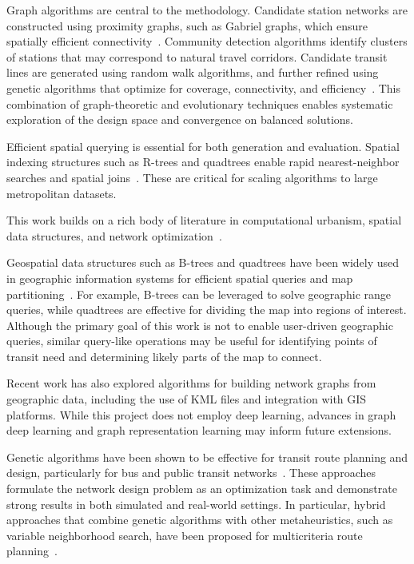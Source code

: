 \documentclass[manuscript]{acmart}
\begin{document}
Graph algorithms are central to the methodology. Candidate station networks are constructed using proximity graphs, such as Gabriel graphs, which ensure spatially efficient connectivity~\cite{bib:samet1984quadtrees, bib:libera1986btrees}. Community detection algorithms identify clusters of stations that may correspond to natural travel corridors. Candidate transit lines are generated using random walk algorithms, and further refined using genetic algorithms that optimize for coverage, connectivity, and efficiency~\cite{bib:chien2001genetic, bib:dib2017ga}. This combination of graph-theoretic and evolutionary techniques enables systematic exploration of the design space and convergence on balanced solutions.

Efficient spatial querying is essential for both generation and evaluation. Spatial indexing structures such as R-trees and quadtrees enable rapid nearest-neighbor searches and spatial joins~\cite{bib:samet1984quadtrees, bib:libera1986btrees}. These are critical for scaling algorithms to large metropolitan datasets.

This work builds on a rich body of literature in computational urbanism, spatial data structures, and network optimization~\cite{bib:bast2016route, bib:chien2001genetic, bib:dib2017ga, bib:silverman1986density, bib:samet1984quadtrees}. 

Geospatial data structures such as B-trees and quadtrees have been widely used in geographic information systems for efficient spatial queries and map partitioning~\cite{bib:libera1986btrees,bib:samet1984quadtrees}. For example, B-trees can be leveraged to solve geographic range queries, while quadtrees are effective for dividing the map into regions of interest. Although the primary goal of this work is not to enable user-driven geographic queries, similar query-like operations may be useful for identifying points of transit need and determining likely parts of the map to connect.

Recent work has also explored algorithms for building network graphs from geographic data, including the use of KML files and integration with GIS platforms. While this project does not employ deep learning, advances in graph deep learning and graph representation learning may inform future extensions.

Genetic algorithms have been shown to be effective for transit route planning and design, particularly for bus and public transit networks~\cite{bib:chien2001genetic,bib:dib2017ga}. These approaches formulate the network design problem as an optimization task and demonstrate strong results in both simulated and real-world settings. In particular, hybrid approaches that combine genetic algorithms with other metaheuristics, such as variable neighborhood search, have been proposed for multicriteria route planning~\cite{bib:dib2017ga}.
\end{document}
